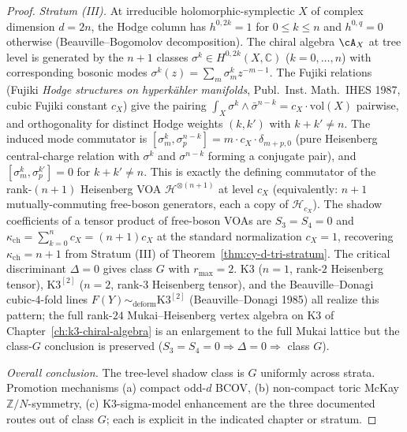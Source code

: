 \begin{proof}
\emph{Stratum (III).} At irreducible holomorphic-symplectic $X$ of
complex dimension $d = 2n$, the Hodge column has $h^{0, 2k} = 1$ for
$0 \leq k \leq n$ and $h^{0, q} = 0$ otherwise (Beauville--Bogomolov
decomposition). The chiral algebra $\cA_X$ at tree level is generated
by the $n + 1$ classes $\sigma^k \in H^{0, 2k}(X, \mathbb{C})$
($k = 0, \ldots, n$) with corresponding bosonic modes
$\sigma^k(z) = \sum_m \sigma^k_m z^{-m - 1}$. The Fujiki relations
(Fujiki \emph{Hodge structures on hyperk\"ahler manifolds}, Publ.~Inst.
Math.\ IHES 1987, cubic Fujiki constant $c_X$) give the pairing
$\int_X \sigma^k \wedge \bar\sigma^{n - k} = c_X \cdot \mathrm{vol}(X)$
pairwise, and orthogonality for distinct Hodge weights $(k, k')$ with
$k + k' \neq n$. The induced mode commutator is
$[\sigma^k_m, \sigma^{n - k}_p] = m \cdot c_X \cdot \delta_{m + p, 0}$
(pure Heisenberg central-charge relation with $\sigma^k$ and
$\sigma^{n - k}$ forming a conjugate pair), and
$[\sigma^k_m, \sigma^{k'}_p] = 0$ for $k + k' \neq n$.
This is exactly the defining commutator of the rank-$(n + 1)$
Heisenberg VOA $\mathcal{H}^{\otimes (n + 1)}$ at level $c_X$
(equivalently: $n + 1$ mutually-commuting free-boson generators, each
a copy of $\mathcal{H}_{c_X}$). The shadow coefficients of a tensor
product of free-boson VOAs are $S_3 = S_4 = 0$ and
$\kappa_{\mathrm{ch}} = \sum_{k = 0}^{n} c_X = (n + 1) c_X$ at the
standard normalization $c_X = 1$, recovering $\kappa_{\mathrm{ch}} = n + 1$
from Stratum (III) of Theorem~\ref{thm:cy-d-tri-stratum}.
The critical discriminant $\Delta = 0$ gives class $G$ with
$r_{\max} = 2$. K3 ($n = 1$, rank-$2$ Heisenberg tensor),
$\mathrm{K3}^{[2]}$ ($n = 2$, rank-$3$ Heisenberg tensor), and the
Beauville--Donagi cubic-4-fold lines $F(Y) \sim_{\mathrm{deform}}
\mathrm{K3}^{[2]}$ (Beauville--Donagi 1985) all realize this pattern;
	the full rank-$24$ Mukai--Heisenberg vertex algebra on K3 of
Chapter~\ref{ch:k3-chiral-algebra} is an enlargement to the full Mukai
lattice but the class-$G$ conclusion is preserved
($S_3 = S_4 = 0 \Rightarrow \Delta = 0 \Rightarrow$ class $G$).

\emph{Overall conclusion.} The tree-level shadow class is $G$
uniformly across strata. Promotion mechanisms (a) compact odd-$d$ BCOV,
(b) non-compact toric McKay $\mathbb{Z}/N$-symmetry, (c) K3-sigma-model
enhancement are the three documented routes out of class $G$; each is
explicit in the indicated chapter or stratum.
\end{proof}

